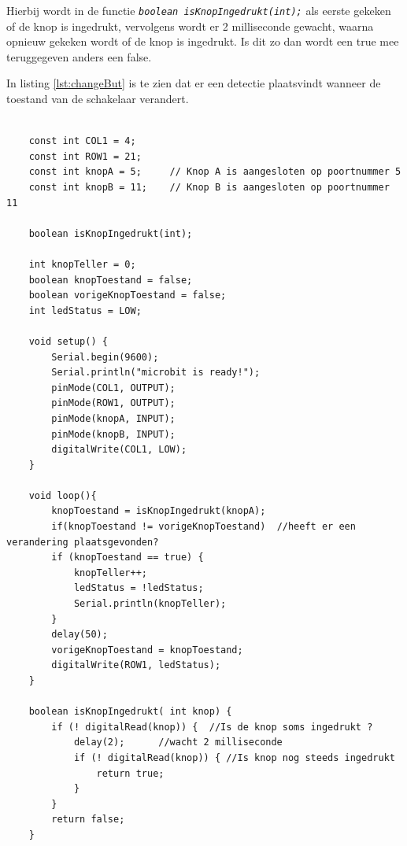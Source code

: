 Hierbij wordt in de functie \texttt{\textit{\textcolor{arduinoBlue}{boolean} isKnopIngedrukt(\textcolor{arduinoBlue}{int});}} als eerste gekeken of de knop is ingedrukt, vervolgens wordt er 2 milliseconde gewacht, waarna opnieuw gekeken wordt of de knop is ingedrukt. Is dit zo dan wordt een \textcolor{arduinoBlue}{true} mee teruggegeven anders een \textcolor{arduinoBlue}{false}.

In listing \ref{lst:changeBut} is te zien dat er een detectie plaatsvindt wanneer de toestand van de schakelaar verandert.
\begin{lstlisting}[caption= Een toestandverandering van de schakelaar.,label={lst:changeBut}]
	
	const int COL1 = 4; 
	const int ROW1 = 21;
	const int knopA = 5;     // Knop A is aangesloten op poortnummer 5
	const int knopB = 11;    // Knop B is aangesloten op poortnummer 11
	
	boolean isKnopIngedrukt(int);
	
	int knopTeller = 0;  
	boolean knopToestand = false;
	boolean vorigeKnopToestand = false;
	int ledStatus = LOW;
	
	void setup() {  
		Serial.begin(9600);
		Serial.println("microbit is ready!");
		pinMode(COL1, OUTPUT);
		pinMode(ROW1, OUTPUT);
		pinMode(knopA, INPUT);  
		pinMode(knopB, INPUT);   
		digitalWrite(COL1, LOW);
	}
	
	void loop(){
		knopToestand = isKnopIngedrukt(knopA);
		if(knopToestand != vorigeKnopToestand)  //heeft er een verandering plaatsgevonden?
		if (knopToestand == true) {
			knopTeller++;
			ledStatus = !ledStatus;
			Serial.println(knopTeller);
		}
		delay(50);
		vorigeKnopToestand = knopToestand;
		digitalWrite(ROW1, ledStatus);
	}
	
	boolean isKnopIngedrukt( int knop) {
		if (! digitalRead(knop)) {  //Is de knop soms ingedrukt ?
			delay(2);      //wacht 2 milliseconde 
			if (! digitalRead(knop)) { //Is knop nog steeds ingedrukt
				return true;
			}
		}
		return false;
	}
	
\end{lstlisting}

